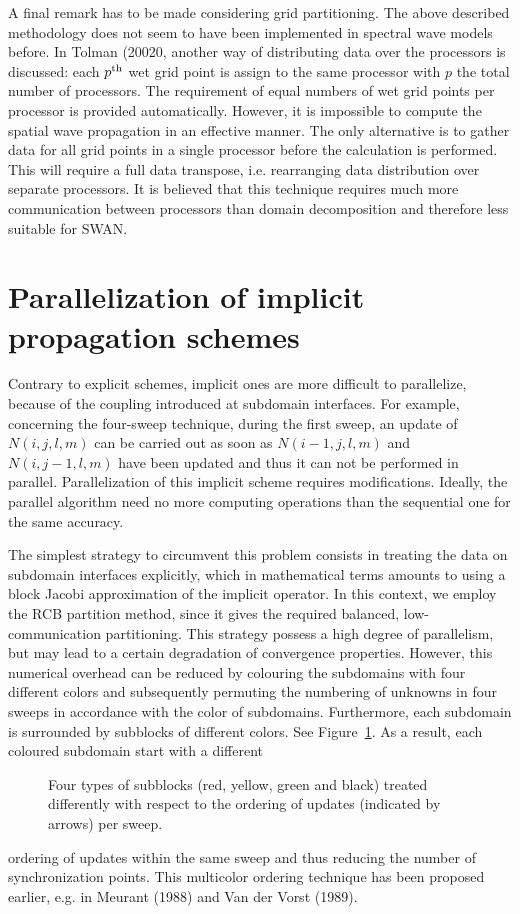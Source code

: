 \documentclass[12pt]{book}
\begin{document}
A final remark has to be made considering grid partitioning. The above described
methodology does not seem to have been implemented in spectral wave models before.
In Tolman (20020, another way of distributing data over the processors is discussed:
each $p^{\rm th}$ wet grid point is assign to the same processor with $p$ the total
number of processors. The requirement of equal numbers of wet grid points per processor
is provided automatically. However, it is impossible to compute the spatial wave
propagation in an effective manner. The only alternative is to gather data for all
grid points in a single processor before the calculation is performed. This will
require a full data transpose, i.e. rearranging data distribution over separate
processors. It is believed that this technique requires much more communication between
processors than domain decomposition and therefore less suitable for SWAN.

\section{Parallelization of implicit propagation schemes} \label{sec:imp}

Contrary to explicit schemes, implicit ones are more difficult to parallelize, because of
the coupling introduced at subdomain interfaces. For example, concerning the four-sweep
technique, during the first sweep, an update of $N(i,j,l,m)$ can be carried out as soon as
$N(i-1,j,l,m)$ and $N(i,j-1,l,m)$ have been updated and thus it can not be performed in
parallel. Parallelization of this implicit scheme requires modifications. Ideally, the
parallel algorithm need no more computing operations than the sequential one for the same
accuracy.

The simplest strategy to circumvent this problem consists in treating the data on subdomain
interfaces explicitly, which in mathematical terms amounts to using a block Jacobi
approximation of the implicit operator. In this context, we employ the RCB partition method,
since it gives the required balanced, low-communication partitioning. This strategy possess
a high degree of parallelism, but may lead to a certain degradation of convergence properties.
However, this numerical overhead can be reduced by colouring the subdomains with four different
colors and subsequently permuting the numbering of unknowns in four sweeps in accordance with
the color of subdomains. Furthermore, each subdomain is surrounded by subblocks of different
colors. See Figure~\ref{fig:colb}. As a result, each coloured subdomain start with a different
\begin{figure}[htb]
   \centerline{
              }
      \caption{Four types of subblocks (red, yellow, green and black) treated differently
               with respect to the ordering of updates (indicated by arrows) per sweep.}
      \label{fig:colb}
\end{figure}
ordering of updates within the same sweep and thus reducing the number of synchronization
points. This multicolor ordering technique has been proposed earlier, e.g. in Meurant (1988)
and Van der Vorst (1989).
\end{document}
